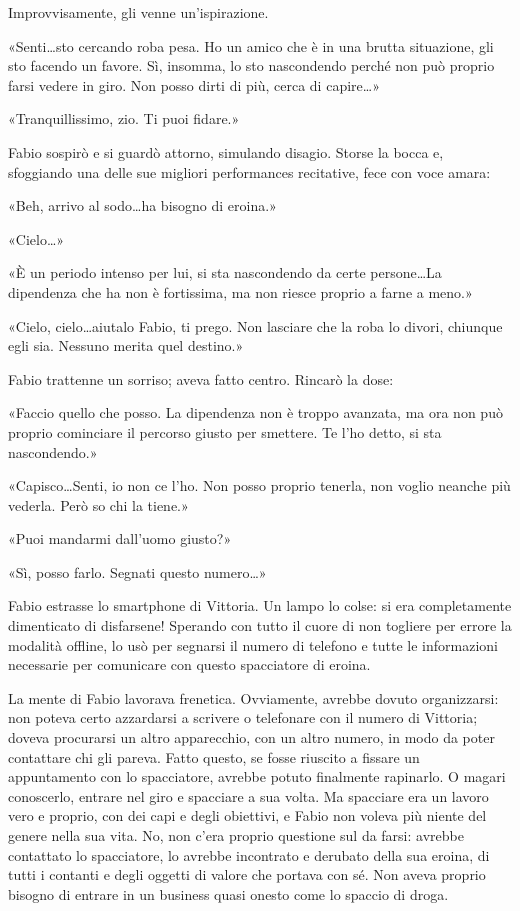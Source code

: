 Improvvisamente, gli venne un'ispirazione.

«Senti\ldots sto cercando roba pesa. Ho un amico che è in una brutta situazione, gli sto facendo un favore. Sì, insomma, lo sto nascondendo perché non può proprio farsi vedere in giro. Non posso dirti di più, cerca di capire\ldots»

«Tranquillissimo, zio. Ti puoi fidare.»

Fabio sospirò e si guardò attorno, simulando disagio. Storse la bocca e, sfoggiando una delle sue migliori performances recitative, fece con voce amara:

«Beh, arrivo al sodo\ldots ha bisogno di eroina.»

«Cielo\ldots»

«È un periodo intenso per lui, si sta nascondendo da certe persone\ldots La dipendenza che ha non è fortissima, ma non riesce proprio a farne a meno.»

«Cielo, cielo\ldots aiutalo Fabio, ti prego. Non lasciare che la roba lo divori, chiunque egli sia. Nessuno merita quel destino.»

Fabio trattenne un sorriso; aveva fatto centro. Rincarò la dose:

«Faccio quello che posso. La dipendenza non è troppo avanzata, ma ora non può proprio cominciare il percorso giusto per smettere. Te l'ho detto, si sta nascondendo.»

«Capisco\ldots Senti, io non ce l'ho. Non posso proprio tenerla, non voglio neanche più vederla. Però so chi la tiene.»

«Puoi mandarmi dall'uomo giusto?»

«Sì, posso farlo. Segnati questo numero\ldots»

Fabio estrasse lo smartphone di Vittoria. Un lampo lo colse: si era completamente dimenticato di disfarsene! Sperando con tutto il cuore di non togliere per errore la modalità offline, lo usò per segnarsi il numero di telefono e tutte le informazioni necessarie per comunicare con questo spacciatore di eroina.

La mente di Fabio lavorava frenetica. Ovviamente, avrebbe dovuto organizzarsi: non poteva certo azzardarsi a scrivere o telefonare con il numero di Vittoria; doveva procurarsi un altro apparecchio, con un altro numero, in modo da poter contattare chi gli pareva. Fatto questo, se fosse riuscito a fissare un appuntamento con lo spacciatore, avrebbe potuto finalmente rapinarlo. O magari conoscerlo, entrare nel giro e spacciare a sua volta. Ma spacciare era un lavoro vero e proprio, con dei capi e degli obiettivi, e Fabio non voleva più niente del genere nella sua vita. No, non c'era proprio questione sul da farsi: avrebbe contattato lo spacciatore, lo avrebbe incontrato e derubato della sua eroina, di tutti i contanti e degli oggetti di valore che portava con sé. Non aveva proprio bisogno di entrare in un business quasi onesto come lo spaccio di droga.


